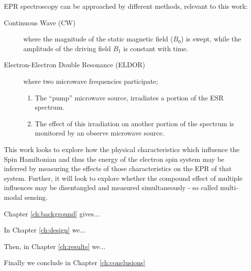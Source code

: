 EPR spectroscopy can be approached by different methods, relevant to this work:
\begin{description}
	\item [Continuous Wave (CW)] where the magnitude of the static magnetic field ($B_0$) is swept, while the
	      amplitude of the driving field $B_1$ is constant with time.


    \item[Electron-Electron Double Resonance (ELDOR)] where two microwave frequencies participate;
        \begin{enumerate}
            \item The “pump” microwave source, irradiates a portion of the ESR spectrum. 
            \item The effect of this irradiation on another portion of the spectrum is monitored by an observe microwave source. \cite{Berliner2011-ww}


        \end{enumerate}
\end{description}

This work looks to explore how the physical characteristics which influence the Spin Hamiltonian and thus the energy of the electron spin system may be inferred by measuring the effects of those characteristics on the EPR of that system. Further, it will look to explore whether the compound effect of multiple influences may be disentangled and measured simultaneously - so called multi-modal sensing.

Chapter \ref{ch:background} gives...

In Chapter \ref{ch:design} we... 

Then, in Chapter \ref{ch:results} we... 

Finally we conclude in Chapter \ref{ch:conclusions} 


